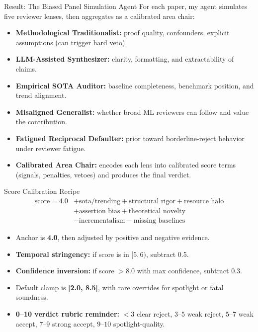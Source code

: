 \documentclass[aspectratio=169]{beamer}
\begin{document}
\begin{frame}{Result: The Biased Panel Simulation Agent}
\small
For each paper, my agent simulates five reviewer lenses, then aggregates as a calibrated area chair:
\vspace{0.3em}
\begin{itemize}
    \item \textbf{Methodological Traditionalist:} proof quality, confounders, explicit assumptions (can trigger hard veto).
    \item \textbf{LLM-Assisted Synthesizer:} clarity, formatting, and extractability of claims.
    \item \textbf{Empirical SOTA Auditor:} baseline completeness, benchmark position, and trend alignment.
    \item \textbf{Misaligned Generalist:} whether broad ML reviewers can follow and value the contribution.
    \item \textbf{Fatigued Reciprocal Defaulter:} prior toward borderline-reject behavior under reviewer fatigue.
    \item \textbf{Calibrated Area Chair:} encodes each lens into calibrated score terms (signals, penalties, vetoes) and produces the final verdict.
\end{itemize}
\end{frame}

\begin{frame}{Score Calibration Recipe}
\small
\[
\begin{aligned}
\text{score} = 4.0
&+ \text{sota/trending} + \text{structural rigor} + \text{resource halo} \\
&+ \text{assertion bias} + \text{theoretical novelty} \\
&- \text{incrementalism} - \text{missing baselines}
\end{aligned}
\]

\begin{itemize}
    \item Anchor is \textbf{4.0}, then adjusted by positive and negative evidence.
    \item \textbf{Temporal stringency:} if score is in $[5,6)$, subtract 0.5.
    \item \textbf{Confidence inversion:} if score $> 8.0$ with max confidence, subtract 0.3.
    \item Default clamp is \textbf{[2.0, 8.5]}, with rare overrides for spotlight or fatal soundness.
    \item \textbf{0--10 verdict rubric reminder:} $<3$ clear reject, $3$--$5$ weak reject, $5$--$7$ weak accept, $7$--$9$ strong accept, $9$--$10$ spotlight-quality.
\end{itemize}
\end{frame}
\end{document}
